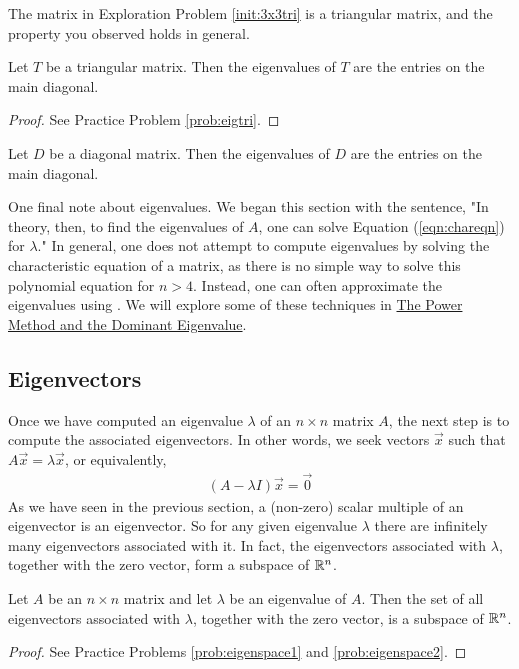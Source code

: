 \documentclass{ximera}
\begin{document}
The matrix in Exploration Problem \ref{init:3x3tri} is a triangular matrix, and the property you observed holds in general.

\begin{theorem}\label{th:eigtri}
Let $T$ be a triangular matrix.  Then the eigenvalues of $T$ are the entries on the main diagonal.
\end{theorem}

\begin{proof}
See Practice Problem \ref{prob:eigtri}.
\end{proof}

\begin{corollary}\label{th:eigdiag}
Let $D$ be a diagonal matrix.  Then the eigenvalues of $D$ are the entries on the main diagonal.
\end{corollary}

One final note about eigenvalues.  We began this section with the sentence, "In theory, then, to find the eigenvalues of $A$, one can solve Equation (\ref{eqn:chareqn}) for $\lambda$."  In general, one does not attempt to compute eigenvalues by solving the characteristic equation of a matrix, as there is no simple way to solve this polynomial equation for $n>4$.  Instead, one can often approximate the eigenvalues using .  We will explore some of these techniques in \href{https://ximera.osu.edu/linearalgebradzv3/LinearAlgebraInteractiveIntro/EIG-0070/main}{The Power Method and the Dominant Eigenvalue}.

\subsection*{Eigenvectors}
Once we have computed an eigenvalue $\lambda$ of an $n \times n$ matrix $A$, the next step is to compute the associated eigenvectors.  In other words, we seek vectors $\vec{x}$ such that $A\vec{x}=\lambda \vec{x}$, or equivalently,
\begin{align}\label{eqn:nullspace}
 (A-\lambda I) \vec{x}=\vec{0}   
\end{align} 
As we have seen in the previous section, a (non-zero) scalar multiple of an eigenvector is an eigenvector.  So for any given eigenvalue $\lambda$ there are infinitely many eigenvectors associated with it.  In fact, the eigenvectors associated with $\lambda$, together with the zero vector, form a subspace of $\mathbb{R}^n$. 

\begin{theorem}\label{th:eigenspace}
    Let $A$ be an $n\times n$ matrix and let $\lambda$ be an eigenvalue of $A$.  Then the set of all eigenvectors associated with $\lambda$, together with the zero vector, is a subspace of $\mathbb{R}^n$.
\end{theorem}
\begin{proof}
    See Practice Problems \ref{prob:eigenspace1} and \ref{prob:eigenspace2}.
\end{proof}
\end{document}
